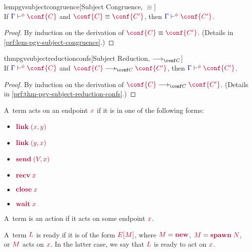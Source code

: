 \documentclass[main.tex]{subfiles}
\begin{document}
\begin{restatablelemma}{lempgvsubjectcongruence}[Subject Congruence, $\equiv$]
  \label{lem:pgv-subject-congruence}
  \hfill\\%
  If $\cseq[\phi]{\ty{\Gamma}}{\conf{C}}$ and $\tm{\conf{C}}\equiv\tm{\conf{C'}}$,
  then $\cseq[\phi]{\ty{\Gamma}}{\conf{C'}}$.
\end{restatablelemma}
\begin{proof}
  By induction on the derivation of $\tm{\conf{C}}\equiv\tm{\conf{C'}}$.
  (Details in \cref{prf:lem-pgv-subject-congruence}.)
\end{proof}

\begin{restatabletheorem}{thmpgvsubjectreductionconfs}[Subject Reduction, $\cred$]
  \label{thm:pgv-subject-reduction-confs}
  \hfill\\%
  If $\cseq[\phi]{\ty{\Gamma}}{\conf{C}}$ and $\tm{\conf{C}}\cred\tm{\conf{C'}}$,
  then $\cseq[\phi]{\ty{\Gamma}}{\conf{C'}}$.
\end{restatabletheorem}
\begin{proof}
  By induction on the derivation of $\tm{\conf{C}}\cred\tm{\conf{C'}}$.
  (Details in \cref{prf:thm-pgv-subject-reduction-confs}.)
\end{proof}

\begin{definition}[Actions]
  \label{def:pgv-actions}
  A~term acts on an endpoint $\tm{x}$ if it is in one of the following forms:
  \begin{multicols}{3}
    \begin{itemize}[noitemsep,topsep=0pt,parsep=0pt,partopsep=0pt]
    \item $\tm{\link\;\pair{x}{y}}$ 
    \item $\tm{\link\;\pair{y}{x}}$
    \item $\tm{\send\;\pair{V}{x}}$
    \item $\tm{\recv\;{x}}$
    \item $\tm{\close\;{x}}$
    \item $\tm{\wait\;{x}}$
    \end{itemize}
  \end{multicols}
  \noindent
  A~term is an action if it acts on some endpoint $\tm{x}$.
\end{definition}

\begin{definition}
  \label{def:pgv-ready-actions}
  A~term $\tm{L}$ is ready if it is of the form $\tm{\plug{E}{M}}$, where $\tm{M}=\tm{\new}$, $\tm{M}=\tm{\spawn\;N}$, or $\tm{M}$ acts on $\tm{x}$. In the latter case, we say that $\tm{L}$ is ready to act on $\tm{x}$.
\end{definition}
\end{document}
